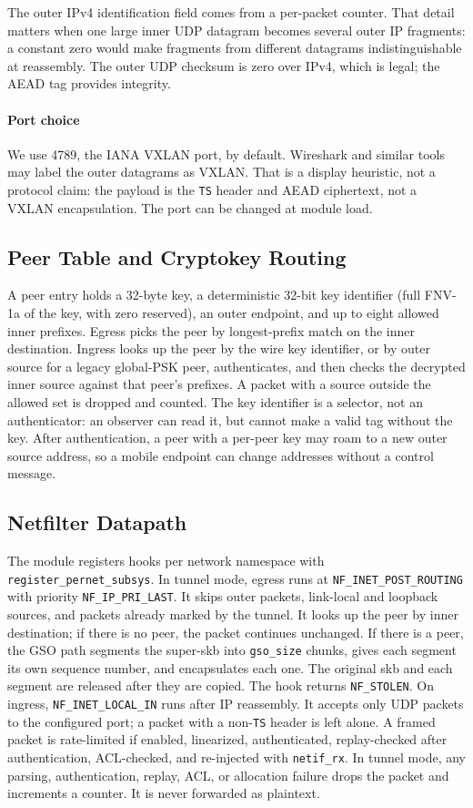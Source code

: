 \documentclass[conference]{IEEEtran}
\newcommand{\code}[1]{\texttt{#1}}
\begin{document}
The outer IPv4 identification field comes from a per-packet counter. That detail matters when one large inner UDP datagram becomes several outer IP fragments: a constant zero would make fragments from different datagrams indistinguishable at reassembly. The outer UDP checksum is zero over IPv4, which is legal; the AEAD tag provides integrity.

\paragraph{Port choice}
We use 4789, the IANA VXLAN port, by default. Wireshark and similar tools may label the outer datagrams as VXLAN. That is a display heuristic, not a protocol claim: the payload is the \code{TS} header and AEAD ciphertext, not a VXLAN encapsulation. The port can be changed at module load.

\subsection{Peer Table and Cryptokey Routing}
A peer entry holds a 32-byte key, a deterministic 32-bit key identifier (full FNV-1a of the key, with zero reserved), an outer endpoint, and up to eight allowed inner prefixes. Egress picks the peer by longest-prefix match on the inner destination. Ingress looks up the peer by the wire key identifier, or by outer source for a legacy global-PSK peer, authenticates, and then checks the decrypted inner source against that peer's prefixes. A packet with a source outside the allowed set is dropped and counted. The key identifier is a selector, not an authenticator: an observer can read it, but cannot make a valid tag without the key. After authentication, a peer with a per-peer key may roam to a new outer source address, so a mobile endpoint can change addresses without a control message.

\subsection{Netfilter Datapath}
\label{sec:netfilter}
The module registers hooks per network namespace with \code{register\_pernet\_subsys}. In tunnel mode, egress runs at \code{NF\_INET\_POST\_ROUTING} with priority \code{NF\_IP\_PRI\_LAST}. It skips outer packets, link-local and loopback sources, and packets already marked by the tunnel. It looks up the peer by inner destination; if there is no peer, the packet continues unchanged. If there is a peer, the GSO path segments the super-skb into \code{gso\_size} chunks, gives each segment its own sequence number, and encapsulates each one. The original skb and each segment are released after they are copied. The hook returns \code{NF\_STOLEN}. On ingress, \code{NF\_INET\_LOCAL\_IN} runs after IP reassembly. It accepts only UDP packets to the configured port; a packet with a non-\code{TS} header is left alone. A framed packet is rate-limited if enabled, linearized, authenticated, replay-checked after authentication, ACL-checked, and re-injected with \code{netif\_rx}. In tunnel mode, any parsing, authentication, replay, ACL, or allocation failure drops the packet and increments a counter. It is never forwarded as plaintext.
\end{document}
